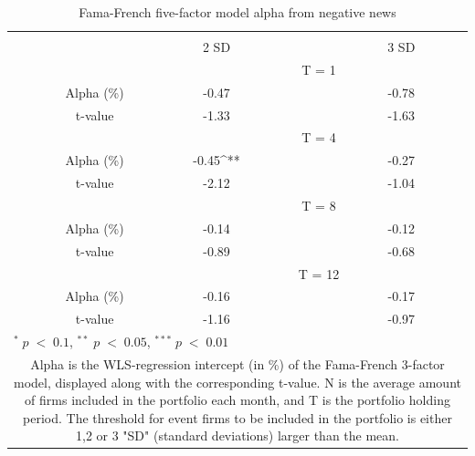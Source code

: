 \setlength{\tabcolsep}{15pt}
\begin{table}[h]
\small
\centering
\caption{Fama-French five-factor model alpha from negative news } 
\begin{tabular}{cccccc}
\hline \hline \\ 
  & & 2 SD  &  & 3 SD  & \\  \cline{3-3} \cline{5-5}
 & &  & T = 1  & & \\ \cline{2-5}
 & Alpha (\%) &   -0.47 &  & -0.78  &  \\ 
 & t-value   & -1.33  & & -1.63 & \\
 & &  & T = 4  & & \\ \cline{2-5}
 & Alpha (\%)  & -0.45^{**} & &  -0.27 & \\
 & t-value & -2.12  & & -1.04  & \\
 & &  & T = 8  & & \\ \cline{2-5}
 & Alpha (\%) & -0.14 & & -0.12 &  \\
 & t-value   & -0.89 & & -0.68 & \\
& &  & T = 12  & & \\ \cline{2-5}
 & Alpha (\%) & -0.16 & & -0.17 &  \\
 & t-value  & -1.16 &  & -0.97  & \\ \hline \hline
 \multicolumn{5}{l}{ \footnotesize $^* \; p\; <\; 0.1$, $ ^{**} \; p\; <\; 0.05$, $ ^{***} \; p\; <\; 0.01$  } \\
 \multicolumn{6}{p{11cm}}{ \footnotesize Alpha is the WLS-regression intercept (in \%) of the Fama-French 3-factor model, displayed along with the corresponding t-value. N is the average amount of firms included in the portfolio each month, and T is the portfolio holding period. The threshold for event firms to be included in the portfolio is either 1,2 or 3 "SD" (standard deviations) larger than the mean.} \\ 
 \hline
\end{tabular}
\label{tab: FF3-neg}
\end{table}







